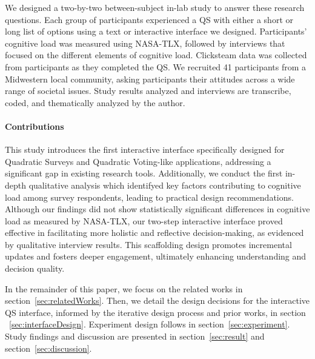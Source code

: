 We designed a two-by-two between-subject in-lab study to answer these research questions. Each group of participants experienced a QS with either a short or long list of options using a text or interactive interface we designed. Participants' cognitive load was measured using NASA-TLX, followed by interviews that focused on the different elements of cognitive load. Clicksteam data was collected from participants as they completed the QS. We recruited 41 participants from a Midwestern local community, asking participants their attitudes across a wide range of societal issues. Study results analyzed and interviews are transcribe, coded, and thematically analyzed by the author.

\paragraph{Contributions}
This study introduces the first interactive interface specifically designed for Quadratic Surveys and Quadratic Voting-like applications, addressing a significant gap in existing research tools. Additionally, we conduct the first in-depth qualitative analysis which identifyed key factors contributing to cognitive load among survey respondents, leading to practical design recommendations. Although our findings did not show statistically significant differences in cognitive load as measured by NASA-TLX, our two-step interactive interface proved effective in facilitating more holistic and reflective decision-making, as evidenced by qualitative interview results. This scaffolding design promotes incremental updates and fosters deeper engagement, ultimately enhancing understanding and decision quality.

In the remainder of this paper, we focus on the related works in section~\ref{sec:relatedWorks}. Then, we detail the design decisions for the interactive QS interface, informed by the iterative design process and prior works, in section ~\ref{sec:interfaceDesign}. Experiment design follows in section~\ref{sec:experiment}. Study findings and discussion are presented in section~\ref{sec:result} and section~\ref{sec:discussion}.



